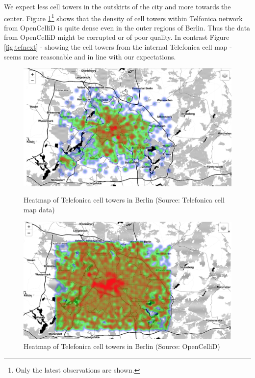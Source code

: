 We expect less cell towers in the outskirts of the city and more towards the center. Figure \ref{fig:opencellid}\footnote{Only the latest observations are shown.} shows that the density of cell towers within Telfonica network from OpenCelliD is quite dense even in the outer regions of Berlin. Thus the data from OpenCelliD might be corrupted or of poor quality. In contrast Figure \ref{fig:tefnext} - showing the cell towers from the internal Telefonica cell map -  seems more reasonable and in line with our expectations.

\begin{figure}[h]
    \begin{minipage}[b]{0.5\textwidth}
    \includegraphics[width=\textwidth]{images/tefnext.png}
    \caption{Heatmap of Telefonica cell towers in Berlin (Source: Telefonica cell map data)}
    \label{fig:tefnext}

    \includegraphics[width=\textwidth]{images/opencellid.png}
    \caption{Heatmap of Telefonica cell towers in Berlin (Source: OpenCelliD) }
    \label{fig:opencellid}
    \end{minipage}\qquad
\end{figure}

